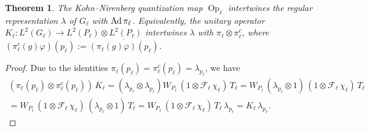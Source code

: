 \documentclass[a4paper,11pt,reqno]{amsart}
\numberwithin{equation}{section}
\newtheorem{theorem}{Theorem}[section]
\theoremstyle{remark}
\theoremstyle{definition}
\newcommand\Op{\operatorname{Op}}
\newcommand{\F}{{\mathcal F}}
\begin{document}
\begin{theorem}
The Kohn--Nirenberg quantization map $\Op_\ell$ intertwines the regular representation $\lambda$ of $G_\ell$ with ${\rm Ad}\,\pi_\ell$. Equivalently, the unitary operator
$K_\ell\colon L^2(G_\ell)\to L^2(P_\ell)\otimes L^2(P_\ell)$
intertwines $\lambda$ with $\pi_\ell\otimes \pi_\ell^c$, where $(\pi_\ell^c(g)\varphi)(p_\ell):=\overline{(\pi_\ell(g)\overline\varphi)(p_\ell)}$.
\end{theorem}
\begin{proof}
Due to the identities $\pi_\ell(p_\ell)=\pi_\ell^c(p_\ell)=\lambda_{p_\ell}$, we have
\begin{multline*}
(\pi_\ell(p_\ell)\otimes \pi_\ell^c(p_\ell))\, K_\ell=(\lambda_{p_\ell}\otimes \lambda_{p_\ell})W_{P_\ell}\,(1\otimes \F_\ell\,\chi_\ell)\,T_\ell
=W_{P_\ell}\,(\lambda_{p_\ell}\otimes1)\,(1\otimes \F_\ell\,\chi_\ell)\,T_\ell\\
=W_{P_\ell}\,(1\otimes \F_\ell\,\chi_\ell)\,(\lambda_{p_\ell}\otimes1)\,T_\ell
=W_{P_\ell}\,(1\otimes \F_\ell\,\chi_\ell)\,T_\ell\,\lambda_{p_\ell}=K_\ell\,\lambda_{p_\ell}.
\end{multline*}


\end{proof}
\end{document}

